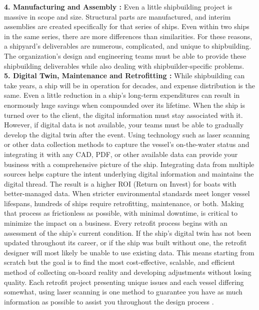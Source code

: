 \textbf{4. Manufacturing and Assembly :}
Even a little shipbuilding project is massive in scope and size. Structural parts are manufactured, and interim assemblies are created specifically for that series of ships. Even within two ships in the same series, there are more differences than similarities.
For these reasons, a shipyard's deliverables are numerous, complicated, and unique to shipbuilding. The organization's design and engineering teams must be able to provide these shipbuilding deliverables while also dealing with shipbuilder-specific problems\cite{Thebuildphase}. \\
\textbf{5. Digital Twin, Maintenance and Retrofitting :}
While shipbuilding can take years, a ship will be in operation for decades, and expense distribution is the same. Even a little reduction in a ship's long-term expenditures can result in enormously huge savings when compounded over its lifetime. When the ship is turned over to the client, the digital information must stay associated with it. However, if digital data is not available, your teams must be able to gradually develop the digital twin after the event. Using technology such as laser scanning or other data collection methods to capture the vessel's on-the-water status and integrating it with any CAD, PDF, or other available data can provide your business with a comprehensive picture of the ship. Integrating data from multiple sources helps capture the intent underlying digital information and maintains the digital thread. The result is a higher ROI (Return on Invest) for boats with better-managed data. When stricter environmental standards meet longer vessel lifespans, hundreds of ships require retrofitting, maintenance, or both. Making that process as frictionless as possible, with minimal downtime, is critical to minimize the impact on a business. Every retrofit process begins with an assessment of the ship's current condition. If the ship's digital twin has not been updated throughout its career, or if the ship was built without one, the retrofit designer will most likely be unable to use existing data. This means starting from scratch but the goal is to find the most cost-effective, scalable, and efficient method of collecting on-board reality and developing adjustments without losing quality. Each retrofit project presenting unique issues and each vessel differing somewhat, using laser scanning is one method to guarantee you have as much information as possible to assist you throughout the design process \cite{LaserscanSSI,Stavroulakis2022}.

